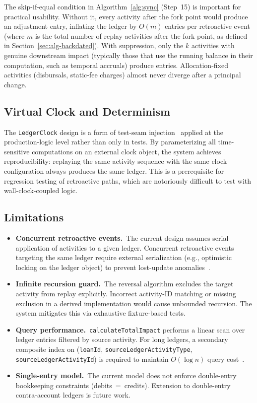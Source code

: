 \documentclass[11pt,letterpaper]{article}
\begin{document}
The skip-if-equal condition in Algorithm~\ref{alg:sync} (Step~15) is
important for practical usability. Without it, every activity after the
fork point would produce an adjustment entry, inflating the ledger by
$O(m)$ entries per retroactive event (where $m$ is the total number of
replay activities after the fork point, as defined in
Section~\ref{sec:alg-backdated}). With suppression, only the $k$
activities with genuine downstream impact (typically those that use the
running balance in their computation, such as temporal accruals) produce
entries. Allocation-fixed activities (disbursals, static-fee charges)
almost never diverge after a principal change.

\subsection{Virtual Clock and Determinism}

The \texttt{LedgerClock} design is a form of test-seam
injection~\cite{feathers2004} applied at the production-logic level
rather than only in tests. By parameterizing all time-sensitive
computations on an external clock object, the system achieves
reproducibility: replaying the same activity sequence with the same
clock configuration always produces the same ledger. This is a
prerequisite for regression testing of retroactive paths, which are
notoriously difficult to test with wall-clock-coupled logic.

\subsection{Limitations}

\begin{itemize}
  \item \textbf{Concurrent retroactive events.}~The current design
        assumes serial application of activities to a given ledger.
        Concurrent retroactive events targeting the same ledger require
        external serialization (e.g., optimistic locking on the ledger
        object) to prevent lost-update anomalies~\cite{grayreuter1992}.
  \item \textbf{Infinite recursion guard.}~The reversal algorithm
        excludes the target activity from replay explicitly. Incorrect
        activity-ID matching or missing exclusion in a derived
        implementation would cause unbounded recursion. The system
        mitigates this via exhaustive fixture-based tests.
  \item \textbf{Query performance.}~\texttt{calculateTotalImpact}
        performs a linear scan over ledger entries filtered by source
        activity. For long ledgers, a secondary composite index on
        (\texttt{loanId}, \texttt{sourceLedgerActivityType},
        \texttt{sourceLedgerActivityId}) is required to maintain
        $O(\log n)$ query cost~\cite{graefe2011}.
  \item \textbf{Single-entry model.}~The current model does not enforce
        double-entry bookkeeping constraints (debits~=~credits).
        Extension to double-entry contra-account ledgers is future work.
\end{itemize}
\end{document}
